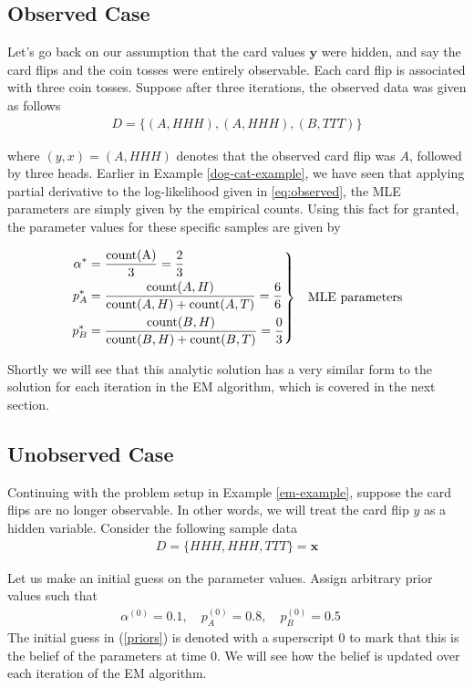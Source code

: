 \documentclass[justified, marginals=justified]{tufte-handout}
\newenvironment{rcases}
{\left.\begin{aligned}}
	{\end{aligned}\right\rbrace}
\theoremstyle{definition}
\begin{document}
\subsection{Observed Case}\label{sec:observed-case}
Let's go back on our assumption that the card values $\mathbf{y}$ were hidden, and say the card flips and the coin tosses were entirely observable. Each card flip is associated with three coin tosses. Suppose after three iterations, the observed data was given as follows
\begin{align*}
D = \{(A, HHH), (A, HHH), (B, TTT)\}
\end{align*}

where $(y,x) = (A, HHH)$ denotes that the observed card flip was $A$, followed by three heads. Earlier in Example \ref{dog-cat-example}, we have seen that applying partial derivative to the log-likelihood given in \eqref{eq:observed}, the MLE parameters are simply given by the empirical counts. Using this fact for granted, the parameter values for these specific samples are given by

\begin{equation*}
\begin{rcases}
\alpha^{*} &= \dfrac{\text{count(A)}}{3}=\dfrac{2}{3} \\
p_A^{*} &= \dfrac{ \text{count}(A,H)} { \text{count}(A, H)+\text{count}(A, T) } = \dfrac{6}{6} \\
p_B^{*} &= \dfrac{ \text{count}(B,H)} { \text{count}(B, H)+\text{count}(B, T) } = \dfrac{0}{3}
\end{rcases}
\text{\quad MLE parameters}
\end{equation*}

Shortly we will see that this analytic solution has a very similar form to the solution for each iteration in the EM algorithm, which is covered in the next section. 

\subsection{Unobserved Case}\label{sec:unobserved-case}

Continuing with the problem setup in Example \ref{em-example}, suppose the card flips are no longer observable. In other words, we will treat the card flip $y$ as a hidden variable. Consider the following sample data
\begin{align*}
D = \{HHH, HHH, TTT\} = \textbf{x}
\end{align*}

Let us make an initial guess on the parameter values. Assign arbitrary prior values such that 
\begin{align}
\label{priors}
\alpha^{(0)} = 0.1,\quad p_A^{(0)}=0.8,\quad p_B^{(0)}=0.5\quad
\end{align}
The initial guess in (\ref{priors}) is denoted with a superscript 0 to mark that this is the belief of the parameters at time 0. We will see how the belief is updated over each iteration of the EM algorithm. 
\end{document}
